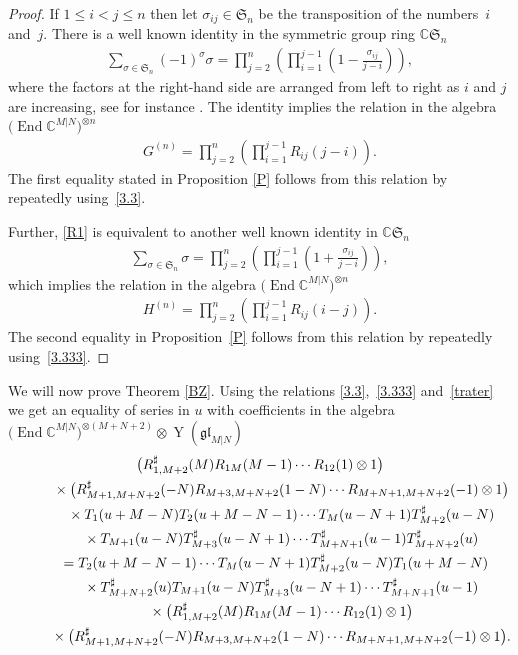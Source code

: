 \documentclass[pdftex]{sigma}
\numberwithin{equation}{section}
\def\CC{{\mathbb{C}}}
\def\CMN{\CC^{M|N}}
\def\End{\operatorname{End}}
\def\glMN{\mathfrak{gl}_{M|N}}
\def\le{\leqslant}
\def\ot{\otimes}
\def\RS{R^{\sharp}}
\def\si{\sigma}
\def\Sym{\mathfrak{S}}
\def\TS{T^{\sharp}}
\def\YMN{\operatorname{Y}(\glMN)}
\begin{document}
\begin{proof}
If $1\le i<j\le n$ then let $\si_{ij}\in\Sym_n$ be the transposition of
the numbers~$i$ and~$j $.
There is a well known identity in the symmetric group ring $\CC \Sym_n$
\begin{gather}\label{R1}
\sum_{\si\in\Sym_n}(-1)^\si \si =
\prod_{j=2}^n \left( \prod_{i=1}^{j-1} \left( 1-\frac{\si_{ij}}{j-i}
\right)\right),
\end{gather}
where the factors at the right-hand side are arranged from left to right
as $i$ and $j$ are increasing, see
for instance \cite[Section~2.3]{MNO}.
The identity implies the relation in the algebra $\big(\End\CMN\big)^{\ot n}${\samepage
\begin{gather}\label{RG}
G^{(n)} =\prod_{j=2}^n \left( \prod_{i=1}^{j-1} R_{ij}(j-i) \right) .
\end{gather}
The first equality stated in Proposition \ref{P} follows from this relation
by repeatedly using~\eqref{3.3}.}

Further, \eqref{R1} is equivalent to another well known
identity in $\CC \Sym_n$
\begin{gather*}
\sum_{\si\in\Sym_n}\si =\prod_{j=2}^n \left( \prod_{i=1}^{j-1} \left( 1+\frac{\si_{ij}}{j-i}\right)\right),
\end{gather*}
which implies the relation in the algebra $\big(\End\CMN\big)^{\ot n}$
\begin{gather}\label{RH}
H^{(n)} =
\prod_{j=2}^n \left(\prod_{i=1}^{j-1} R_{ij}(i-j) \right) .
\end{gather}
The second equality in Proposition~\ref{P} follows from this relation
by repeatedly using~\eqref{3.333}.
\end{proof}

We will now prove Theorem \ref{BZ}. Using the relations \eqref{3.3},~\eqref{3.333} and~\eqref{trater}
we get an equality of series in $u$ with coefficients
in the algebra $\big(\End\CMN\big)^{\ot (M+N+2)}\ot\YMN$
\begin{gather}
\big( \RS_{1,M+2} (M ) R_{1M} (M-1) \cdots R_{12} (1)\ot1 \big)\notag\\
\qquad\quad{} \times
\big( \RS_{M+1,M+N+2} (-N )
R_{M+3,M+N+2} (1-N) \cdots R_{M+N+1,M+N+2} (-1)\ot1 \big)\notag\\
\qquad\quad{}\times
T_1 (u+M-N) T_2 (u+M-N-1) \cdots T_{M} (u-N+1)
\TS_{M+2} (u-N)\notag\\
\qquad\quad {} \times T_{M+1} (u-N)
\TS_{M+3} (u-N+1) \cdots \TS_{M+N+1} (u-1) \TS_{M+N+2} (u)\notag\\
\qquad{}=T_2 (u+M-N-1) \cdots T_{M} (u-N+1)
\TS_{M+2} (u-N) T_1 (u+M-N)\notag\\
\qquad\quad{} \times
\TS_{M+N+2} (u) T_{M+1} (u-N)
\TS_{M+3} (u-N+1) \cdots \TS_{M+N+1} (u-1)\notag\\
\qquad\quad{} \times
\big( \RS_{1,M+2} (M )
R_{1M} (M-1) \cdots R_{12} (1)\ot1 \big)\notag\\
\qquad\quad{} \times
\big( \RS_{M+1,M+N+2} (-N )
R_{M+3,M+N+2} (1-N) \cdots R_{M+N+1,M+N+2} (-1)\ot1 \big) .\label{E1}
\end{gather}
\end{document}
